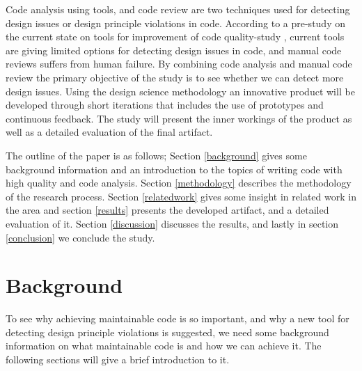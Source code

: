 \documentclass{article}
\begin{document}
Code analysis using tools, and code review are two techniques used for detecting design issues or design principle violations in code. According to a pre-study on the current state on tools for improvement of code quality-study \cite{prestudy}, current tools are giving limited options for detecting design issues in code, and manual code reviews suffers from human failure.   By combining code analysis and manual code review the primary objective of the study is to see whether we can detect more design issues. Using the design science methodology an innovative product will be developed through short iterations that includes the use of prototypes and continuous feedback. The study will present the inner workings of the product as well as a detailed evaluation of the final artifact.






The outline of the paper is as follows; Section \ref{background} gives some background information and an introduction to the topics of writing code with high quality and code analysis. Section \ref{methodology} describes the methodology of the research process. Section \ref{relatedwork} gives some insight in related work in the area and section \ref{results} presents the developed artifact, and a detailed evaluation of it. Section \ref{discussion} discusses the results, and lastly in section \ref{conclusion} we conclude the study.  

\section{Background}
\label{background}
To see why achieving maintainable code is so important, and why a new tool for detecting design principle violations is suggested, we need some background information on what maintainable code is and how we can achieve it. The following sections will give a brief introduction to it.
\end{document}
